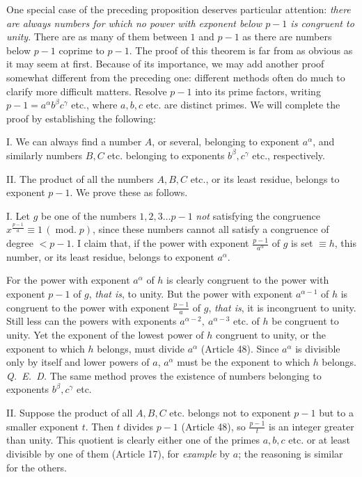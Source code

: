 
One special case of the preceding proposition deserves particular attention: \emph{there are always numbers for which no power with exponent below $p-1$ is congruent to unity}. There are as many of them between $1$ and $p-1$ as there are numbers below $p-1$ coprime to $p-1$. The proof of this theorem is far from as obvious as it may seem at first. Because of its importance, we may add another proof somewhat different from the preceding one: different methods often do much to clarify more difficult matters. Resolve $p-1$ into its prime factors, writing $p-1=a^\alpha b^\beta c^\gamma$ etc., where $a,b,c$ etc. are distinct primes. We will complete the proof by establishing the following:

I. We can always find a number $A$, or several, belonging to exponent $a^\alpha$, and similarly numbers $B,C$ etc. belonging to exponents $b^\beta,c^\gamma$ etc., respectively.

II. The product of all the numbers $A,B,C$ etc., or its least residue, belongs to exponent $p-1$. We prove these as follows.

I. Let $g$ be one of the numbers $1,2,3\ldots p-1$ \emph{not} satisfying the congruence $x^{\frac{p-1}{a}}\equiv1\,(\operatorname{mod.}p)$, since these numbers cannot all satisfy a congruence of degree $<p-1$. I claim that, if the power with exponent ${\frac{p-1}{a^\alpha}}$ of $g$ is set $\equiv h$, this number, or its least residue, belongs to exponent $a^\alpha$.

For the power with exponent $a^{\alpha}$ of $h$ is clearly congruent to the power with exponent $p-1$ of $g$, \emph{that is}, to unity. But the power with exponent $a^{\alpha-1}$ of $h$ is congruent to the power with exponent ${\frac{p-1}{a}}$ of $g$, \emph{that is}, it is incongruent to unity. Still less can the powers with exponents $a^{\alpha-2},\ a^{\alpha-3}$ etc. of $h$ be congruent to unity. Yet the exponent of the lowest power of $h$ congruent to unity, or the exponent to which $h$ belongs, must divide $a^\alpha$ (Article 48). Since $a^\alpha$ is divisible only by itself and lower powers of $a$, $a^\alpha$ must be the exponent to which $h$ belongs. \mbox{\emph{Q. E. D.}} The same method proves the existence of numbers belonging to exponents $b^\beta,c^\gamma$ etc.

II. Suppose the product of all $A,B,C$ etc. belongs not to exponent $p-1$ but to a smaller exponent $t$. Then $t$ divides $p-1$ (Article 48), so $\frac{p-1}{t}$ is an integer greater than unity. This quotient is clearly either one of the primes $a,b,c$ etc. or at least divisible by one of them (Article 17), for \emph{example} by $a$; the reasoning is similar for the others.

